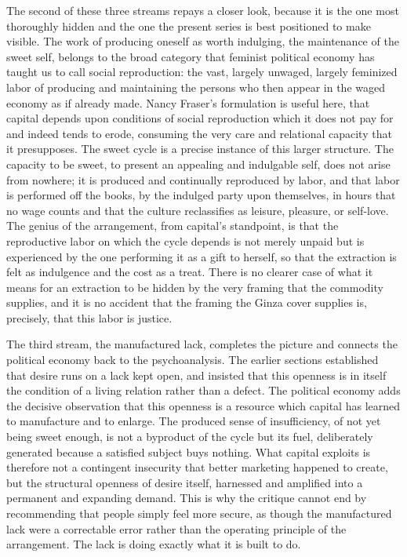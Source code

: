 \documentclass[11pt,a4paper]{article}
\begin{document}
The second of these three streams repays a closer look, because it is the one most thoroughly hidden and the one the present series is best positioned to make visible. The work of producing oneself as worth indulging, the maintenance of the sweet self, belongs to the broad category that feminist political economy has taught us to call social reproduction: the vast, largely unwaged, largely feminized labor of producing and maintaining the persons who then appear in the waged economy as if already made. Nancy Fraser's formulation is useful here, that capital depends upon conditions of social reproduction which it does not pay for and indeed tends to erode, consuming the very care and relational capacity that it presupposes. The sweet cycle is a precise instance of this larger structure. The capacity to be sweet, to present an appealing and indulgable self, does not arise from nowhere; it is produced and continually reproduced by labor, and that labor is performed off the books, by the indulged party upon themselves, in hours that no wage counts and that the culture reclassifies as leisure, pleasure, or self-love. The genius of the arrangement, from capital's standpoint, is that the reproductive labor on which the cycle depends is not merely unpaid but is experienced by the one performing it as a gift to herself, so that the extraction is felt as indulgence and the cost as a treat. There is no clearer case of what it means for an extraction to be hidden by the very framing that the commodity supplies, and it is no accident that the framing the Ginza cover supplies is, precisely, that this labor is justice.

The third stream, the manufactured lack, completes the picture and connects the political economy back to the psychoanalysis. The earlier sections established that desire runs on a lack kept open, and insisted that this openness is in itself the condition of a living relation rather than a defect. The political economy adds the decisive observation that this openness is a resource which capital has learned to manufacture and to enlarge. The produced sense of insufficiency, of not yet being sweet enough, is not a byproduct of the cycle but its fuel, deliberately generated because a satisfied subject buys nothing. What capital exploits is therefore not a contingent insecurity that better marketing happened to create, but the structural openness of desire itself, harnessed and amplified into a permanent and expanding demand. This is why the critique cannot end by recommending that people simply feel more secure, as though the manufactured lack were a correctable error rather than the operating principle of the arrangement. The lack is doing exactly what it is built to do.
\end{document}
